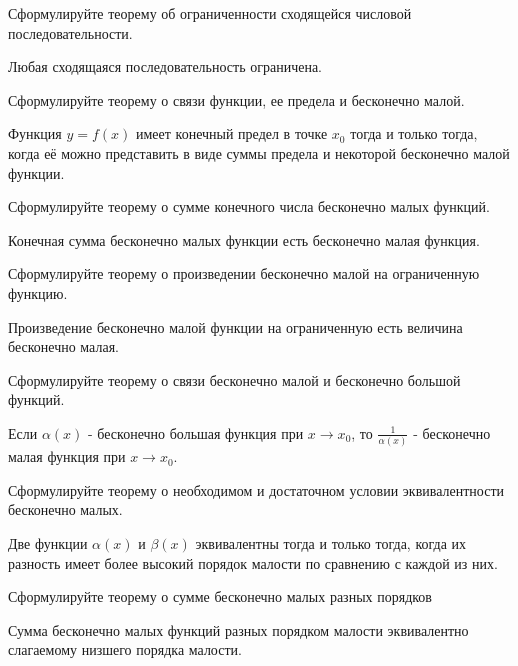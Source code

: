 \begin{question}
  Сформулируйте теорему об ограниченности сходящейся числовой последовательности.
\end{question}
\begin{answer}
  Любая сходящаяся последовательность ограничена.
\end{answer}

\begin{question}
  Сформулируйте теорему о связи функции, ее предела и бесконечно малой.  
\end{question}
\begin{answer}
  Функция $y = f(x)$ имеет конечный предел в точке  $x_0$ тогда и только тогда, когда её можно представить в виде суммы предела и некоторой бесконечно малой функции.
\end{answer}

\begin{question}
  Сформулируйте теорему о сумме конечного числа бесконечно малых функций.
\end{question}
\begin{answer}
  Конечная сумма бесконечно малых функции есть бесконечно малая функция.
\end{answer}

\begin{question}
  Сформулируйте теорему о произведении бесконечно малой на ограниченную функцию.
\end{question}
\begin{answer}
  Произведение бесконечно малой функции на ограниченную есть величина бесконечно малая.  
\end{answer}

\begin{question}
  Сформулируйте теорему о связи бесконечно малой и бесконечно большой функций.
\end{question}
\begin{answer}
  Если $\alpha(x)$ - бесконечно большая функция при $x \to x_0$, то $\frac{1}{\alpha(x)}$ - бесконечно малая функция при $x \to x_0$.  
\end{answer}

\begin{question}
  Сформулируйте теорему о необходимом и достаточном условии эквивалентности бесконечно малых.
\end{question}
\begin{answer}
  Две функции $\alpha(x)$ и $\beta(x)$ эквивалентны тогда и только тогда, когда их разность имеет более высокий порядок малости по сравнению с каждой из них.
\end{answer}

\begin{question}
  Сформулируйте теорему о сумме бесконечно малых разных порядков
\end{question}
\begin{answer}
  Сумма бесконечно малых функций разных порядком малости эквивалентно слагаемому низшего порядка малости.
\end{answer}


